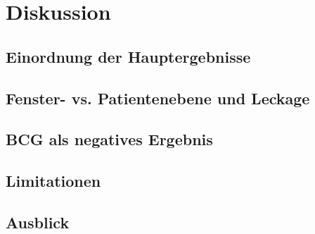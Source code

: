 \chapter{Diskussion}
\section{Einordnung der Hauptergebnisse}
\section{Fenster- vs. Patientenebene und Leckage}
\section{BCG als negatives Ergebnis}
\section{Limitationen}
\section{Ausblick}